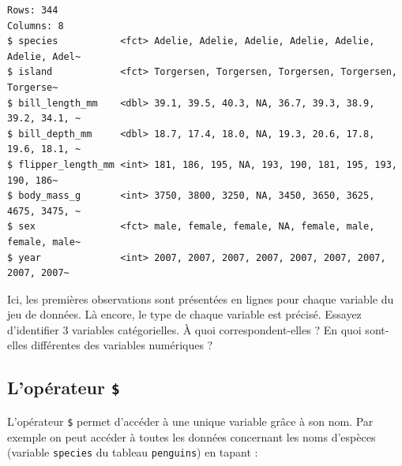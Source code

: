 \documentclass[
  a4paper,
  DIV=11,
  numbers=noendperiod,
  oneside]{scrreprt}
\newenvironment{Shaded}{}{}
\newcommand{\NormalTok}[1]{\textcolor[rgb]{0.14,0.16,0.18}{#1}}
\newcommand{\SpecialCharTok}[1]{\textcolor[rgb]{0.00,0.36,0.77}{#1}}
\begin{document}
\begin{verbatim}
Rows: 344
Columns: 8
$ species           <fct> Adelie, Adelie, Adelie, Adelie, Adelie, Adelie, Adel~
$ island            <fct> Torgersen, Torgersen, Torgersen, Torgersen, Torgerse~
$ bill_length_mm    <dbl> 39.1, 39.5, 40.3, NA, 36.7, 39.3, 38.9, 39.2, 34.1, ~
$ bill_depth_mm     <dbl> 18.7, 17.4, 18.0, NA, 19.3, 20.6, 17.8, 19.6, 18.1, ~
$ flipper_length_mm <int> 181, 186, 195, NA, 193, 190, 181, 195, 193, 190, 186~
$ body_mass_g       <int> 3750, 3800, 3250, NA, 3450, 3650, 3625, 4675, 3475, ~
$ sex               <fct> male, female, female, NA, female, male, female, male~
$ year              <int> 2007, 2007, 2007, 2007, 2007, 2007, 2007, 2007, 2007~
\end{verbatim}

Ici, les premières observations sont présentées en lignes pour chaque
variable du jeu de données. Là encore, le type de chaque variable est
précisé. Essayez d'identifier 3 variables catégorielles. À quoi
correspondent-elles ? En quoi sont-elles différentes des variables
numériques ?

\subsection{\texorpdfstring{L'opérateur
\texttt{\$}}{L'opérateur \$}}\label{lopuxe9rateur}

L'opérateur \texttt{\$} permet d'accéder à une unique variable grâce à
son nom. Par exemple on peut accéder à toutes les données concernant les
noms d'espèces (variable \texttt{species} du tableau \texttt{penguins})
en tapant :

\begin{Shaded}
\end{Shaded}
\end{document}
